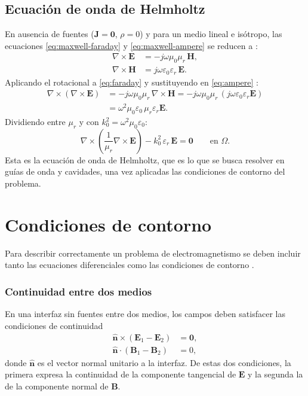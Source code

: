 \documentclass[12pt]{report} %
\begin{document}
\subsection{Ecuaci\'on de onda de Helmholtz}\label{subsec:maxwell-f}
En ausencia de fuentes ($\mathbf{J}=\mathbf{0}$, $\rho=0$) y para un medio
lineal e is\'otropo, las ecuaciones \eqref{eq:maxwell-faraday} y
\eqref{eq:maxwell-ampere} se reducen a \cite{jin2015, pozar2012}:
\begin{align}
	\nabla \times \mathbf{E} &= -j\omega\mu_0\mu_r\, \mathbf{H}, \label{eq:faraday}\\
	\nabla \times \mathbf{H} &= j\omega\varepsilon_0\varepsilon_r\, \mathbf{E}. \label{eq:ampere}
\end{align}
Aplicando el rotacional a \eqref{eq:faraday} y sustituyendo en
\eqref{eq:ampere} \cite{jin2015, jacobsson2007nedelec}:
\begin{align}
	\nabla \times (\nabla \times \mathbf{E})
	&= -j\omega\mu_0\mu_r\, \nabla \times \mathbf{H}
	= -j\omega\mu_0\mu_r\, (j\omega\varepsilon_0\varepsilon_r \mathbf{E})
	\nonumber\\
	&= \omega^2\mu_0\varepsilon_0\, \mu_r\varepsilon_r \mathbf{E}.
\end{align}
Dividiendo entre $\mu_r$ y con $k_0^2 = \omega^2\mu_0\varepsilon_0$:
\begin{equation}\label{eq:curlcurl}
	\nabla \times \left( \frac{1}{\mu_r} \nabla \times \mathbf{E} \right)
	- k_0^2\, \varepsilon_r\, \mathbf{E} = \mathbf{0}
	\qquad \text{en } \Omega.
\end{equation}
Esta es la ecuaci\'on de onda de Helmholtz, que es lo que se busca resolver en
gu\'ias de onda y cavidades, una vez aplicadas las condiciones de contorno del
problema.

\section{Condiciones de contorno}\label{subsec:pec}
Para describir correctamente un problema de electromagnetismo se deben incluir tanto las ecuaciones diferenciales como las condiciones de contorno \cite{jin2015}.

\subsubsection{Continuidad entre dos medios}
En una interfaz sin fuentes entre dos medios, los campos deben satisfacer las
condiciones de continuidad
\begin{align}
	\hat{\mathbf{n}} \times (\mathbf{E}_1 - \mathbf{E}_2) &= \mathbf{0}, \label{eq:bc-et}\\
	\hat{\mathbf{n}} \cdot (\mathbf{B}_1 - \mathbf{B}_2) &= 0, \label{eq:bc-bn}
\end{align}
donde $\hat{\mathbf{n}}$ es el vector normal unitario a la interfaz. De estas
dos condiciones, la primera expresa la continuidad de la componente tangencial
de $\mathbf{E}$ y la segunda la de la componente normal de $\mathbf{B}$.
\end{document}
